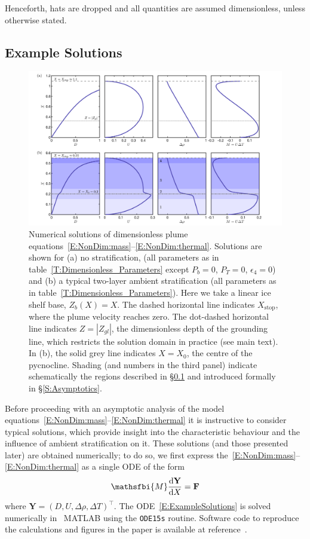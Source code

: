 \documentclass[openacc]{rsproca_new}%
\newcommand{\dd}[2]{\frac{\mathrm{d} #1}{\mathrm{d} #2}}
\newcommand{\epsfour}{\epsilon_{4}}
\newcommand{\Pt}{\textit{P}_T}
\begin{document}
Henceforth, hats are dropped and all quantities are assumed dimensionless, unless otherwise stated.

\subsection{Example Solutions}\label{S:ExampleSolutions}

\begin{figure}
\centering
\includegraphics[width = \textwidth]{Submitted_PRSA/make_plots/plots/figure3.png}
\caption{Numerical solutions of dimensionless plume equations~\eqref{E:NonDim:mass}--\eqref{E:NonDim:thermal}. Solutions are shown for (a) no stratification, (all parameters as in table~\ref{T:Dimensionless_Parameters} except $P_b = 0$, $\Pt = 0$, $\epsfour = 0$) and (b)  a typical two-layer ambient stratification (all parameters as in table~\ref{T:Dimensionless_Parameters}). Here we take a linear ice shelf base, $Z_b(X) = X$. The dashed horizontal line indicates $X_{\text{stop}}$, where the plume velocity reaches zero. The dot-dashed horizontal line indicates $Z = |Z_{gl}|$, the dimensionless depth of the grounding line, which restricts the solution domain in practice (see main text). In (b), the solid grey line indicates $X = X_0$, the centre of the pycnocline. Shading (and numbers in the third panel) indicate schematically the regions described in \S\ref{S:ExampleSolutions} and introduced formally in \S\ref{S:Asymptotics}. }\label{fig:ExampleSols}
\end{figure}

Before proceeding with an asymptotic analysis of the model equations~\eqref{E:NonDim:mass}--\eqref{E:NonDim:thermal} it is instructive to consider typical solutions, which provide insight into the characteristic behaviour and the influence of ambient stratification on it. These solutions (and those presented later) are obtained numerically; to do so, we first express the~\eqref{E:NonDim:mass}--\eqref{E:NonDim:thermal} as a single ODE of the form
\begin{equation}\label{E:ExampleSolutions}
\mathsfbi{M} \dd{\mathbf{Y}}{X} = \mathbf{F}
\end{equation}
where $\mathbf{Y} = (D, U, \Delta \rho, \Delta T)^\intercal$. The ODE~\eqref{E:ExampleSolutions} is solved numerically in ~\textsc{MATLAB} using the \texttt{ODE15s} routine. Software code to reproduce the calculations and figures in the paper is available at reference~\citep{PycnoclineCode}.
\end{document}
